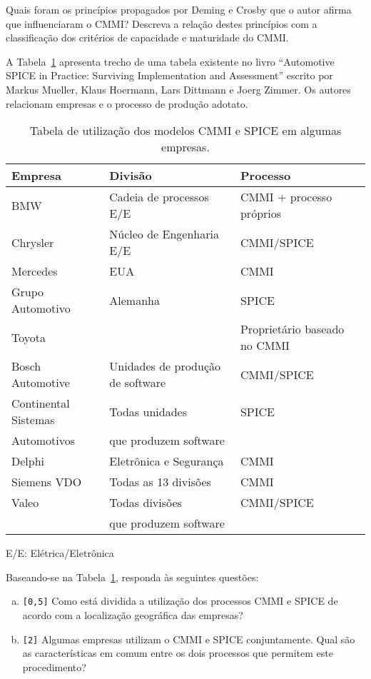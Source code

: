 Quais foram os princípios propagados por Deming e Crosby que o autor
afirma que influenciaram o CMMI? Descreva a relação destes princípios
com a classificação dos critérios de capacidade e maturidade do CMMI.

 A Tabela~\ref{tab:cmmi-spice} apresenta trecho de uma
tabela existente no livro ``Automotive SPICE in Practice: Surviving
Implementation and Assessment'' escrito por Markus Mueller, Klaus
Hoermann, Lars Dittmann e Joerg Zimmer. Os autores relacionam empresas
e o processo de produção adotato.

\begin{table}[ht]
  \centering
  \begin{tabular}[ht]{l|l|l}\hline
    \bf\hfil Empresa &\bf\hfil Divisão &\bf\hfil Processo \\\hline
    BMW & Cadeia de processos E/E & CMMI + processo próprios\\\hline
    Chrysler & Núcleo de Engenharia E/E & CMMI/SPICE\\\hline
    Mercedes & EUA & CMMI \\
    Grupo Automotivo & Alemanha & SPICE\\\hline
    Toyota & & Proprietário baseado no CMMI\\
    Bosch Automotive & Unidades de produção de software & CMMI/SPICE\\\hline
    Continental Sistemas & Todas unidades & SPICE\\
    Automotivos & que produzem software & \\\hline
    Delphi & Eletrônica e Segurança & CMMI \\\hline
    Siemens VDO & Todas as 13 divisões & CMMI \\\hline
    Valeo & Todas divisões & CMMI/SPICE \\
    & que produzem software & \\\hline
  \end{tabular}
  \caption{Tabela de utilização dos modelos CMMI e SPICE em algumas empresas.}
  \label{tab:cmmi-spice}
\end{table}
{\small\noindent E/E: Elétrica/Eletrônica}

Baseando-se na Tabela~\ref{tab:cmmi-spice}, responda às seguintes questões:
\begin{enumerate}[a)]
\item {\tt [0,5]} Como está dividida a utilização dos processos CMMI e
  SPICE de acordo com a localização geográfica das empresas?
\item {\tt [2]} Algumas empresas utilizam o CMMI e SPICE
  conjuntamente. Qual são as características em comum entre os dois
  processos que permitem este procedimento?
\end{enumerate}


